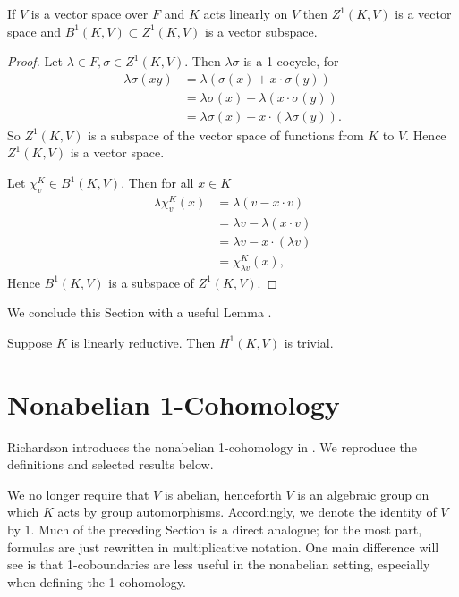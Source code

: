 \begin{lemma} \label{vspace} If $V$ is a vector space over $F$ and $K$ acts linearly on $V$ then $Z^1(K, V)$ is a vector space and $B^1(K, V)\subset Z^1(K, V)$ is a vector subspace.
\end{lemma}
\begin{proof} 
	Let $\lambda \in F, \sigma \in Z^1(K, V)$. Then $\lambda\sigma$ is a 1-cocycle, for
\begin{align*}
	\lambda \sigma(xy) &= \lambda\left( \sigma(x) + x \cdot \sigma(y)\right) \\
	&= \lambda\sigma(x) + \lambda(x\cdot \sigma(y)) \\
	&= \lambda\sigma(x) + x \cdot (\lambda\sigma(y)).
\end{align*}
So $Z^1(K, V)$ is a subspace of the vector space of functions from $K$ to $V$. Hence $Z^1(K, V)$ is a vector space.


Let $\chi^K_v \in B^1(K, V)$. Then for all $x \in K$
\begin{align*}
	\lambda\chi^K_v(x) &= \lambda\left(v - x \cdot v\right) \\
		&= \lambda v - \lambda(x \cdot v) \\
		&= \lambda v - x \cdot (\lambda v) \\
		&= \chi^K_{\lambda v}(x),
\end{align*}
Hence $B^1(K, V)$ is a subspace of $Z^1(K, V)$.
\end{proof}

We conclude this Section with a useful Lemma \cite[Proposition 1]{kemper2000characterization}.
\begin{lemma} Suppose $K$ is linearly reductive. Then $H^1(K, V)$ is trivial.
  \label{lem:lin_red_h}
\end{lemma}

\section{Nonabelian 1-Cohomology}
	
Richardson introduces the nonabelian 1-cohomology in \cite{richardson1982orbits}. We reproduce the definitions and selected results below.

We no longer require that $V$ is abelian, henceforth $V$ is an algebraic group on which $K$ acts by group automorphisms. Accordingly, we denote the identity of $V$ by $1$. Much of the preceding Section is a direct analogue; for the most part, formulas are just rewritten in multiplicative notation.
One main difference will see is that 1-coboundaries are less useful in the nonabelian setting, especially when defining the 1-cohomology.

